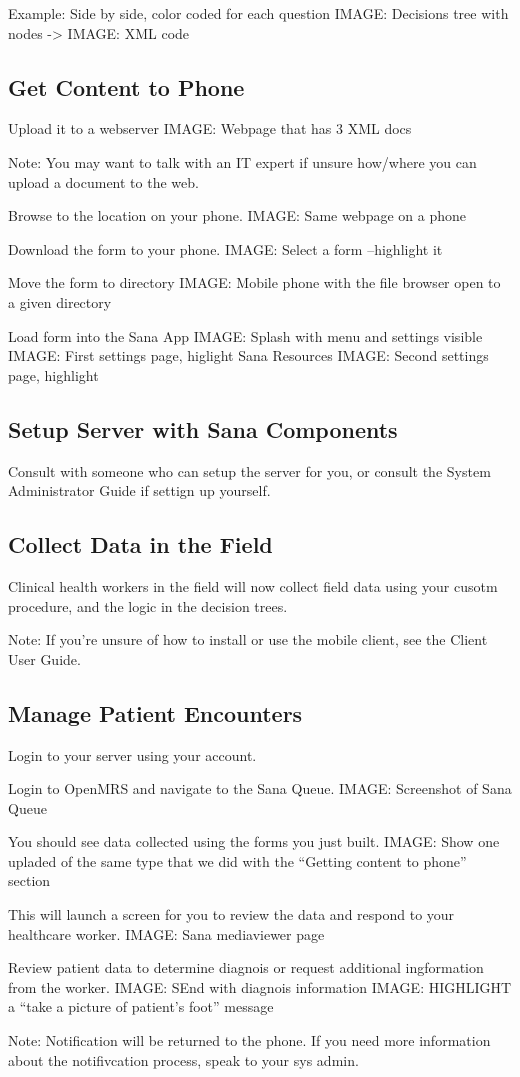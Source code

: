 \documentclass[a4paper,10pt]{article}
\begin{document}
Example: Side by side, color coded for each question
{IMAGE: Decisions tree with nodes}  ->  {IMAGE: XML code}


\subsection{Get Content to Phone}
Upload it to a webserver 
{IMAGE: Webpage that has 3 XML docs}

Note: You may want to talk with an IT expert if unsure how/where you can upload a document to the web.

Browse to the location on your phone.
{IMAGE: Same webpage on a phone}

Download the form to your phone.
{IMAGE: Select a form --highlight it}

Move the form to directory
{IMAGE: Mobile phone with the file browser open to a given directory}

Load form into the Sana App
{IMAGE: Splash with menu and settings visible}
{IMAGE: First settings page, higlight Sana Resources}
{IMAGE: Second settings page, highlight}

\subsection{Setup Server with Sana Components}
Consult with someone who can setup the server for you, or consult the System Administrator Guide if settign up yourself. 

\subsection{Collect Data in the Field}
Clinical health workers in the field will now collect field data using your cusotm procedure, and the logic in the decision trees. 

Note: If you're unsure of how to install or use the mobile client, see the Client User Guide.

\subsection{Manage Patient Encounters}
Login to your server using your account.

Login to OpenMRS and navigate to the Sana Queue.
{IMAGE: Screenshot of Sana Queue}

You should see data collected using the forms you just built.
{IMAGE: Show one upladed of the same type that we did with the ``Getting content to phone'' section}

This will launch a screen for you to review the data and respond to your healthcare worker.
{IMAGE: Sana mediaviewer page}

Review patient data to determine diagnois or request additional ingformation from the worker. 
{IMAGE: SEnd with diagnois information} {IMAGE: HIGHLIGHT a ``take a picture of patient's foot'' message}

Note: Notification will be returned to the phone. If you need more information about the notifivcation process, speak to your sys admin. 

\clearpage{}
\end{document}
